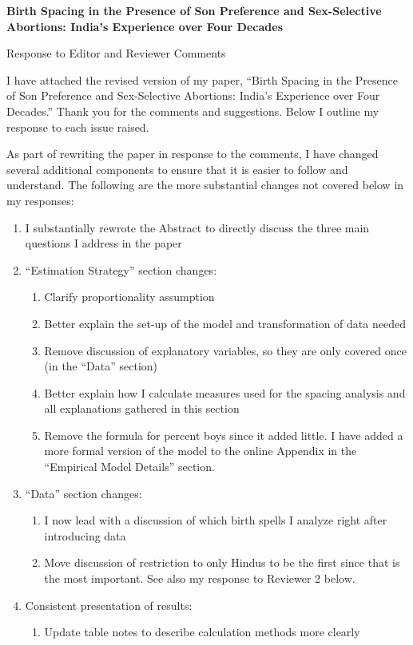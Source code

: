 \documentclass[letterpaper,12pt]{article}
\title{} \author{}
\begin{document}
\begin{center} \textbf{\large Birth Spacing in the Presence of Son
Preference and 
Sex-Selective Abortions: India's Experience over Four Decades}
\end{center}

\begin{center} Response to Editor and Reviewer Comments \end{center}

\noindent I have attached the revised version of my paper,
``Birth Spacing in the Presence of Son Preference and Sex-Selective
Abortions: India's Experience over Four Decades.''
Thank you for the comments and suggestions. 
Below I outline my response to each issue raised.


As part of rewriting the paper in response to the comments, I have changed several 
additional components to ensure that it is easier to follow and understand.
The following are the more substantial changes not covered below in my responses:
\begin{enumerate}
    \item I substantially rewrote the Abstract to directly discuss the three main 
    questions I address in the paper
	\item ``Estimation Strategy'' section changes:
	\begin{enumerate}
		\item Clarify proportionality assumption
		\item Better explain the set-up of the model and transformation of data needed
		\item Remove discussion of explanatory variables, so they are
		only covered once (in the ``Data'' section)
		\item Better explain how I calculate measures used for the spacing
		analysis and all explanations gathered in this section
		\item Remove the formula for percent boys since it added little. 
		I have added a more formal version of the model to the online Appendix in the
		``Empirical Model Details'' section.
	\end{enumerate}
	\item ``Data'' section changes:
	\begin{enumerate}
		\item I now lead with a discussion of which birth spells I analyze right after 
		introducing data
		\item Move discussion of restriction to only Hindus to be the first since that is 
		the most important. 
		See also my response to Reviewer 2 below.
	\end{enumerate}
	\item Consistent presentation of results:
	\begin{enumerate}
		\item Update table notes to describe calculation methods more clearly
	\end{enumerate}
\end{enumerate}
\end{document}
